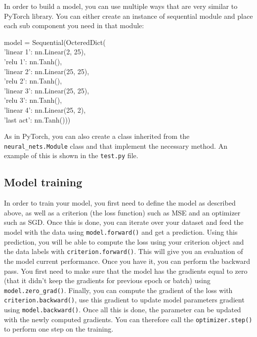 \documentclass[10pt,conference,compsocconf]{IEEEtran}
\begin{document}
In order to build a model, you can use multiple ways that are very similar to PyTorch library. You can either create an instance of sequential module and place each sub component you need in that module:

model = Sequential(OcteredDict( \\
                'linear 1': nn.Linear(2, 25), \\
                'relu 1': nn.Tanh(), \\
                'linear 2': nn.Linear(25, 25), \\
                'relu 2': nn.Tanh(), \\
                'linear 3': nn.Linear(25, 25), \\
                'relu 3': nn.Tanh(), \\
                'linear 4': nn.Linear(25, 2), \\
                'last act': nn.Tanh()))

As in PyTorch, you can also create a class inherited from the \texttt{neural\_nets.Module} class and that implement the necessary method. An example of this is shown in the \texttt{test.py} file.

\subsection{Model training}

In order to train your model, you first need to define the model as described above, as well as a criterion (the loss function) such as MSE and an optimizer such as SGD. Once this is done, you can iterate over your dataset and feed the model with the data using \texttt{model.forward()} and get a prediction. Using this prediction, you will be able to compute the loss using your criterion object and the data labels with \texttt{criterion.forward()}. This will give you an evaluation of the model current performance. Once you have it, you can perform the backward pass. You first need to make sure that the model has the gradients equal to zero (that it didn't keep the gradients for previous epoch or batch) using \texttt{model.zero\_grad()}. Finally, you can compute the gradient of the loss with \texttt{criterion.backward()}, use this gradient to update model parameters gradient using \texttt{model.backward()}. Once all this is done, the parameter can be updated with the newly computed gradients. You can therefore call the \texttt{optimizer.step()} to perform one step on the training. 
\end{document}
